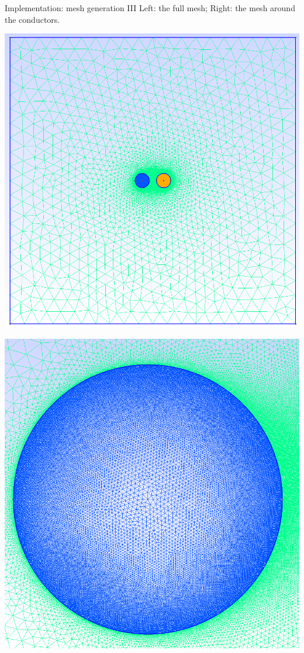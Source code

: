 \documentclass[aspectratio=54,xcolor=dvipsnames]{beamer}
\begin{document}
\begin{frame}{Implementation: mesh generation III}
    Left: the full mesh; Right: the mesh around the conductors.
    \begin{center}
        \begin{minipage}{0.48\textwidth}
            \centering
            \includegraphics[width=\textwidth]{Images/Mesh_full.png}
        \end{minipage}\hfill
        \begin{minipage}{0.48\textwidth}
            \centering
            \includegraphics[width=\textwidth]{Images/Mesh_cond.png}
        \end{minipage}
    \end{center}
\end{frame}
\end{document}
